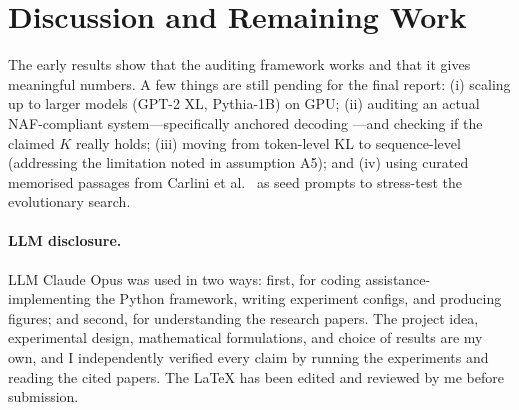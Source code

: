 \documentclass{article}
\begin{document}
\section{Discussion and Remaining Work}
\label{sec:discussion}

The early results show that the auditing framework works and that it gives meaningful numbers. A few things are still pending for the final report:
(i) scaling up to larger models (GPT-2 XL, Pythia-1B) on GPU;
(ii) auditing an actual NAF-compliant system---specifically anchored decoding \cite{he2026anchored}---and checking if the claimed $K$ really holds;
(iii) moving from token-level KL to sequence-level (addressing the limitation noted in assumption A5);
and (iv) using curated memorised passages from Carlini et al.\ \cite{carlini2021extracting} as seed prompts to stress-test the evolutionary search.

\paragraph{LLM disclosure.}
LLM Claude Opus was used in two ways: first, for coding assistance-implementing the Python framework, writing experiment configs, and producing figures; and second, for understanding the research papers. The project idea, experimental design, mathematical formulations, and choice of results are my own, and I independently verified every claim by running the experiments and reading the cited papers. The LaTeX has been edited and reviewed by me before submission.


\end{document}
